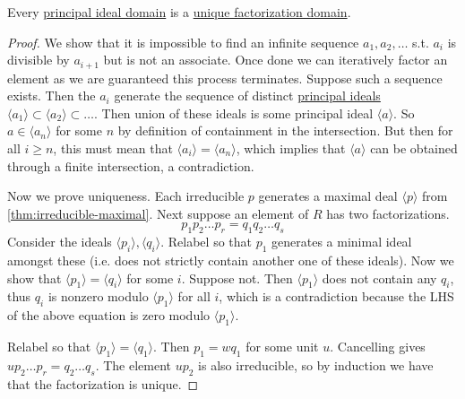   \begin{theorem}
    \label{thm:pids-are-ufds}
    Every \hyperref[def:principal-ideal-domain]{principal ideal domain} is a \hyperref[def:unique-factorization-domain]{unique factorization domain}. 
  \end{theorem}
  \begin{proof}
    We show that it is impossible to find an infinite sequence $a_1, a_2, \ldots$ s.t. $a_i$ is divisible by $a_{i+1}$ but is not an associate. Once done we can iteratively factor an element as we are guaranteed this process terminates. Suppose such a sequence exists. Then the $a_i$ generate the sequence of distinct \hyperref[def:principal-ideals]{principal ideals} $\langle a_1 \rangle \subset \langle a_2 \rangle \subset \ldots$. Then union of these ideals is some principal ideal $\langle a \rangle$. So $a \in \langle a_n \rangle$ for some $n$ by definition of containment in the intersection. But then for all $i \geq n$, this must mean that $\langle a_i \rangle = \langle a_n \rangle$, which implies that $\langle a \rangle$ can be obtained through a finite intersection, a contradiction. 

    Now we prove uniqueness. Each irreducible $p$ generates a maximal deal $\langle p \rangle$ from \ref{thm:irreducible-maximal}. Next suppose an element of $R$ has two factorizations. 
    \begin{equation}
      p_1 p_2 \ldots p_r = q_1 q_2 \ldots q_s 
    \end{equation}
    Consider the ideals $\langle p_i \rangle, \langle q_i \rangle$. Relabel so that $p_1$ generates a minimal ideal amongst these (i.e. does not strictly contain another one of these ideals). Now we show that $\langle p_1 \rangle = \langle q_i \rangle$ for some $i$. Suppose not. Then $\langle p_1 \rangle$ does not contain any $q_i$, thus $q_i$ is nonzero modulo $\langle p_1 \rangle$  for all $i$, which is a contradiction because the LHS of the above equation is zero modulo $\langle p_1 \rangle$. 

    Relabel so that $\langle p_1 \rangle = \langle q_1 \rangle$. Then $p_1 = w q_1$ for some unit $u$. Cancelling gives $u p_2 \ldots p_r = q_2 \ldots q_s$. The element $u p_2$ is also irreducible, so by induction we have that the factorization is unique. 
  \end{proof}


